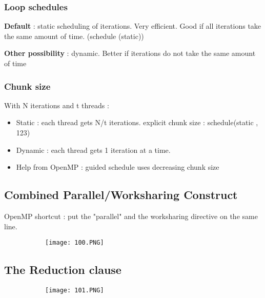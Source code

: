 \documentclass{article}
\begin{document}
\subsubsection{Loop schedules}

\textbf{Default} : static scheduling of iterations. Very efficient. Good if all iterations take the same amount of time. (schedule (static))

\textbf{Other possibility} : dynamic. Better if iterations do not take the same amount of time

\subsubsection{Chunk size}

With N iterations and t threads : 

\begin{itemize}
    \item Static : each thread gets N/t iterations. explicit chunk size : schedule(static , 123)
    \item Dynamic : each thread gets 1 iteration at a time.
    \item Help from OpenMP : guided schedule uses decreasing chunk size
\end{itemize}

\subsection{Combined Parallel/Worksharing Construct}

OpenMP shortcut : put the "parallel" and the worksharing directive on the same line.

\begin{figure}[ht!]
  \centering
  \begin{subfigure}[b]{0.5\linewidth}
    \texttt{[image: 100.PNG]}
  \end{subfigure}
\end{figure}

\subsection{The Reduction clause}

\begin{figure}[ht!]
  \centering
  \begin{subfigure}[b]{0.5\linewidth}
    \texttt{[image: 101.PNG]}
  \end{subfigure}
\end{figure}
\end{document}
